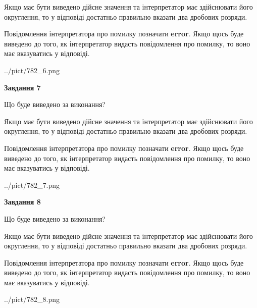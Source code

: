\documentclass[12pt, ukrainian]{article}
\begin{document}
{\begin {Large}
Якщо має бути виведено дійсне значення та інтерпретатор має здійснювати його округлення, 
то у відповіді достатньо правильно вказати два дробових розряди.

Повідомлення інтерпретатора про помилку позначати \textbf{error}.
Якщо щось буде виведено до того, як інтерпретатор видасть повідомлення про помилку, 
то воно має вказуватись у відповіді. \par

\begin{center}
	{../pict/782_6.png}
\end{center}
\newpage

{\begin {center}\textbf{Завдання 7}\end {center}}\par
Що буде виведено за виконання? \par

Якщо має бути виведено дійсне значення та інтерпретатор має здійснювати його округлення, 
то у відповіді достатньо правильно вказати два дробових розряди.

Повідомлення інтерпретатора про помилку позначати \textbf{error}.
Якщо щось буде виведено до того, як інтерпретатор видасть повідомлення про помилку, 
то воно має вказуватись у відповіді. \par

\begin{center}
	{../pict/782_7.png}
\end{center}
\newpage

{\begin {center}\textbf{Завдання 8}\end {center}}\par
Що буде виведено за виконання? \par

Якщо має бути виведено дійсне значення та інтерпретатор має здійснювати його округлення, 
то у відповіді достатньо правильно вказати два дробових розряди.

Повідомлення інтерпретатора про помилку позначати \textbf{error}.
Якщо щось буде виведено до того, як інтерпретатор видасть повідомлення про помилку, 
то воно має вказуватись у відповіді. \par

\begin{center}
	{../pict/782_8.png}
\end{center}
\newpage


\end{Large}}
\end{document}
